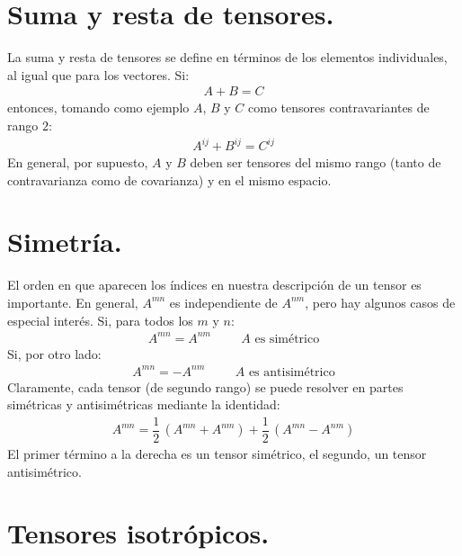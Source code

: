 \documentclass[14pt]{extarticle}
\numberwithin{equation}{section}
\begin{document}
\section{Suma y resta de tensores.}

La suma y resta de tensores se define en términos de los elementos individuales, al igual que para los vectores. Si:
\begin{align}
A + B = C
\label{eq:ecuacion_04_09}
\end{align}
entonces, tomando como ejemplo $A$, $B$ y $C$ como tensores contravariantes de rango $2$:
\begin{align}
A^{ij} + B^{ij} = C^{ij}
\label{eq:ecuacion_04_10}
\end{align}
En general, por supuesto, $A$ y $B$ deben ser tensores del mismo rango (tanto de contravarianza como de covarianza) y en el mismo espacio.

\section{Simetría.}

El orden en que aparecen los índices en nuestra descripción de un tensor es importante. En general, $A^{mn}$ es independiente de $A^{nm}$, pero hay algunos casos de especial interés. Si, para todos los $m$ y $n$:
\begin{align}
A^{mn} = A^{nm} \hspace{1cm} A \text{ es simétrico}
\label{eq:ecuacion_04_11}
\end{align}
Si, por otro lado:
\begin{align}
A^{mn} = -A^{nm} \hspace{1cm} A \text{ es antisimétrico}
\label{eq:ecuacion_04_12}
\end{align}
Claramente, cada tensor (de segundo rango) se puede resolver en partes simétricas y antisimétricas mediante la identidad:
\begin{align}
A^{mn} = \dfrac{1}{2} \, \left( A^{mn} + A^{nm} \right) + \dfrac{1}{2} \, \left( A^{mn} - A^{nm} \right)
\label{eq:ecuacion_04_13}
\end{align}
El primer término a la derecha es un tensor simétrico, el segundo, un tensor antisimétrico.

\section{Tensores isotrópicos.}
\end{document}
